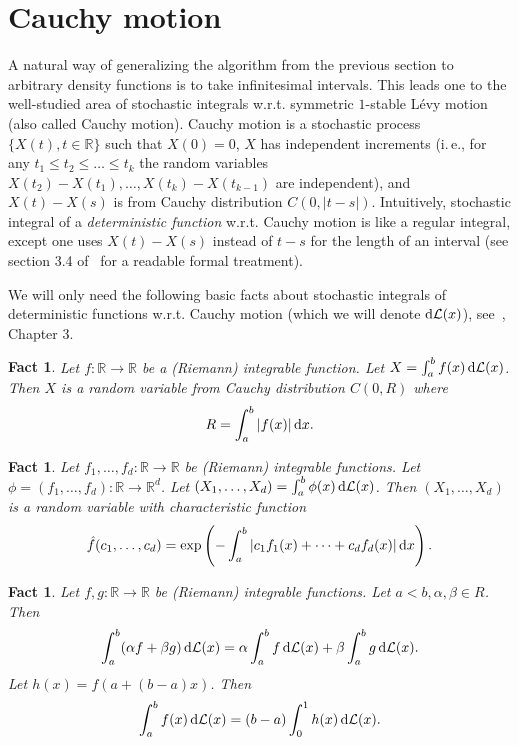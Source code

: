 \documentclass[11pt]{article}
\def\R{{\mathbb R}}
\def\({\left(} \def\){\right)} \def\hatU{\widehat{U}}
\newtheorem{fct}[thm]{Fact}
\begin{document}
\section{Cauchy motion}\label{z3}

A natural way of generalizing the algorithm from the previous section to arbitrary
density functions is to take infinitesimal intervals. This leads one to the well-studied area of stochastic
integrals w.r.t. symmetric $1$-stable L\'evy motion (also called Cauchy motion). Cauchy motion
is a stochastic process $\{X(t),t\in\R\}$ such that $X(0)=0$, $X$ has independent increments
(i.\,e., for any $t_1\leq t_2\leq\dots\leq t_k$ the random variables
$X(t_2)-X(t_1),\dots,X(t_k)-X(t_{k-1})$ are independent), and $X(t)-X(s)$ is
from Cauchy distribution $C(0,|t-s|)$. Intuitively, stochastic integral of a {\em deterministic function}
w.r.t. Cauchy motion is like a regular integral, except one uses $X(t)-X(s)$ instead of $t-s$
for the length of an interval (see section 3.4 of~\cite{ST94} for a readable formal
treatment).

We will only need the following basic facts about
stochastic integrals of deterministic functions w.r.t. Cauchy motion (which we will denote ${\rm d}{\cal L}(x)$),
see~\cite{ST94}, Chapter 3.

\begin{fct}\label{fact1}
Let $f:\R\rightarrow\R$ be a (Riemann) integrable function. Let
$X=\int_a^b f(x)\,{\rm d}{\cal L}(x)$.
Then $X$ is a random variable from Cauchy distribution $C(0,R)$ where
\begin{equation}\label{mrch}
R=\int_a^b |f(x)|\,{\rm d}x.
\end{equation}
\end{fct}

\begin{fct}\label{fact2}
Let $f_1,\dots,f_d:\R\rightarrow\R$ be (Riemann) integrable functions. Let $\phi=(f_1,\dots,f_d):\R\rightarrow\R^d$.
Let $(X_1,\dots,X_d)=\int_a^b \phi(x)\,{\rm d}{\cal L}(x)$.
Then $(X_1,\dots,X_d)$ is a random variable with characteristic function
$$
\hat{f}(c_1,\dots,c_d)=\exp\(-\int_{a}^b |c_1f_1(x)+\dots+c_df_d(x)|\,{\rm d}x\).
$$
\end{fct}

\begin{fct}\label{fact3}
Let $f,g:\R\rightarrow\R$ be (Riemann) integrable functions. Let $a < b,\alpha,\beta\in R$. Then
$$
\int_a^b (\alpha f+\beta g)\,{\rm d}{\cal L}(x) =
\alpha\int_a^b f\,{\rm d}{\cal L}(x) + \beta\int_a^b g\,{\rm d}{\cal L}(x).
$$
Let $h(x)=f(a+(b-a)x)$. Then
$$
\int_a^b f(x) \,{\rm d}{\cal L}(x) = (b-a)\int_0^1 h(x) \,{\rm d}{\cal L}(x).
$$
\end{fct}
\end{document}
